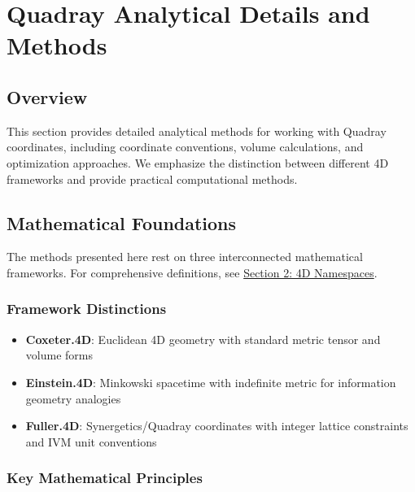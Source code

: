 \documentclass[
  10pt,
]{article}
\providecommand{\tightlist}{%
  \setlength{\itemsep}{0pt}\setlength{\parskip}{0pt}}
\begin{document}
\section{Quadray Analytical Details and
Methods}\label{quadray-analytical-details-and-methods}

\subsection{Overview}\label{overview-1}

This section provides detailed analytical methods for working with
Quadray coordinates, including coordinate conventions, volume
calculations, and optimization approaches. We emphasize the distinction
between different 4D frameworks and provide practical computational
methods.

\subsection{Mathematical Foundations}\label{mathematical-foundations}

The methods presented here rest on three interconnected mathematical
frameworks. For comprehensive definitions, see
\href{02_4d_namespaces.md}{Section 2: 4D Namespaces}.

\subsubsection{Framework Distinctions}\label{framework-distinctions}

\begin{itemize}
\tightlist
\item
  \textbf{Coxeter.4D}: Euclidean 4D geometry with standard metric tensor
  and volume forms
\item
  \textbf{Einstein.4D}: Minkowski spacetime with indefinite metric for
  information geometry analogies\\
\item
  \textbf{Fuller.4D}: Synergetics/Quadray coordinates with integer
  lattice constraints and IVM unit conventions
\end{itemize}

\subsubsection{Key Mathematical
Principles}\label{key-mathematical-principles}
\end{document}
